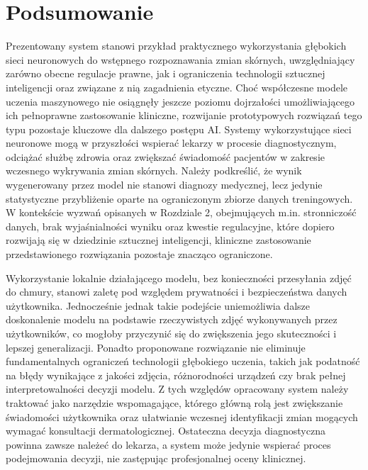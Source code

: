 \section{Podsumowanie}
Prezentowany system stanowi przykład praktycznego wykorzystania głębokich sieci neuronowych do wstępnego rozpoznawania zmian skórnych, uwzględniający zarówno obecne regulacje prawne, jak i ograniczenia technologii sztucznej inteligencji oraz związane z nią zagadnienia etyczne.
Choć współczesne modele uczenia maszynowego nie osiągnęły jeszcze poziomu dojrzałości umożliwiającego ich pełnoprawne zastosowanie kliniczne, rozwijanie prototypowych rozwiązań tego typu pozostaje kluczowe dla dalszego postępu AI.
Systemy wykorzystujące sieci neuronowe mogą w przyszłości wspierać lekarzy w procesie diagnostycznym, odciążać służbę zdrowia oraz zwiększać świadomość pacjentów w zakresie wczesnego wykrywania zmian skórnych.
Należy podkreślić, że wynik wygenerowany przez model nie stanowi diagnozy medycznej, lecz jedynie statystyczne przybliżenie oparte na ograniczonym zbiorze danych treningowych.
W kontekście wyzwań opisanych w Rozdziale 2, obejmujących m.in. stronniczość danych, brak wyjaśnialności wyniku oraz kwestie regulacyjne, które dopiero rozwijają się w dziedzinie sztucznej inteligencji, kliniczne zastosowanie przedstawionego rozwiązania pozostaje znacząco ograniczone.

Wykorzystanie lokalnie działającego modelu, bez konieczności przesyłania zdjęć do chmury, stanowi zaletę pod względem prywatności i bezpieczeństwa danych użytkownika.
Jednocześnie jednak takie podejście uniemożliwia dalsze doskonalenie modelu na podstawie rzeczywistych zdjęć wykonywanych przez użytkowników, co mogłoby przyczynić się do zwiększenia jego skuteczności i lepszej generalizacji.
Ponadto proponowane rozwiązanie nie eliminuje fundamentalnych ograniczeń technologii głębokiego uczenia, takich jak podatność na błędy wynikające z jakości zdjęcia, różnorodności urządzeń czy brak pełnej interpretowalności decyzji modelu.
Z tych względów opracowany system należy traktować jako narzędzie wspomagające, którego główną rolą jest zwiększanie świadomości użytkownika oraz ułatwianie wczesnej identyfikacji zmian mogących wymagać konsultacji dermatologicznej.
Ostateczna decyzja diagnostyczna powinna zawsze należeć do lekarza, a system może jedynie wspierać proces podejmowania decyzji, nie zastępując profesjonalnej oceny klinicznej.